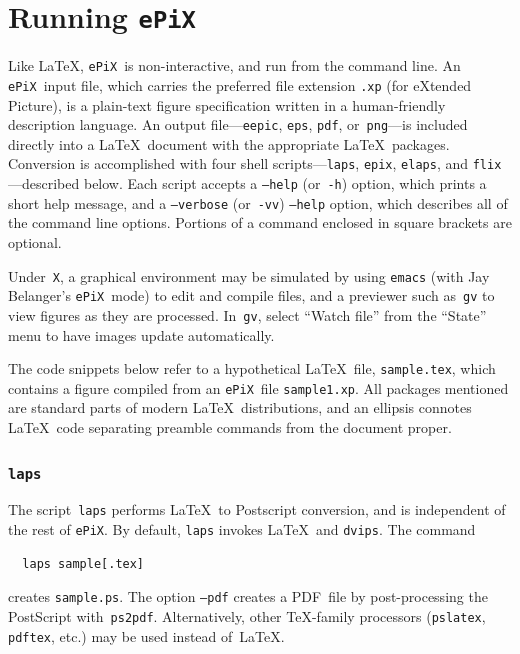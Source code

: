 \documentclass[12pt]{report}
\newcommand{\code}[1]{\texttt{#1}}
\newcommand{\filename}[1]{\texttt{#1}}
\newcommand{\ePiX}{\code{ePiX}}
\begin{document}
\section{Running \ePiX}
\label{section:running}

Like \LaTeX, \ePiX\ is non-interactive, and run from the command
line. An \ePiX\ input file, which carries the preferred file extension
\filename{.xp} (for eXtended Picture), is a plain-text figure
specification written in a human-friendly description language. An
output file---\code{eepic}, \code{eps}, \code{pdf}, or~\code{png}---is
included directly into a \LaTeX\ document with the appropriate
\LaTeX\ packages. Conversion is accomplished with four shell
scripts---\code{laps}, \code{epix}, \code{elaps}, and
\code{flix}---described below. Each script accepts a \code{--help}
(or~\code{-h}) option, which prints a short help message, and a
\code{--verbose} (or~\code{-vv}) \code{--help} option, which describes
all of the command line options. Portions of a command enclosed in
square brackets are optional.

Under~\code{X}, a graphical environment may be simulated by using
\code{emacs} (with Jay Belanger's \ePiX\ mode) to edit and compile
files, and a previewer such as~\code{gv} to view figures as they are
processed. In~\code{gv}, select ``Watch file'' from the ``State'' menu
to have images update automatically.

The code snippets below refer to a hypothetical \LaTeX\ file,
\filename{sample.tex}, which contains a figure compiled from an \ePiX\
file \filename{sample1.xp}. All packages mentioned are standard parts
of modern \LaTeX\ distributions, and an ellipsis connotes \LaTeX\ code
separating preamble commands from the document proper.


\subsubsection*{\code{laps}}

The script~\code{laps} performs \LaTeX\ to Postscript conversion, and
is independent of the rest of \ePiX. By default, \code{laps} invokes
\LaTeX~and \code{dvips}. The command
\begin{verbatim}
  laps sample[.tex]
\end{verbatim}
creates \filename{sample.ps}. The option \code{--pdf} creates a
PDF~file by post-processing the PostScript with~\code{ps2pdf}.
Alternatively, other \TeX-family processors (\code{pslatex},
\code{pdftex}, etc.) may be used instead of~\LaTeX.
\end{document}
